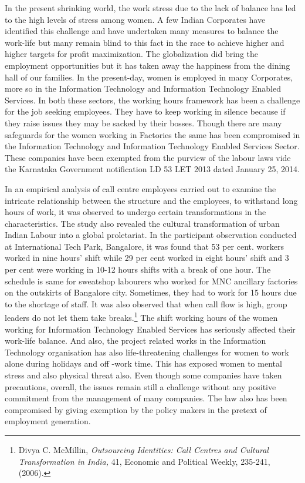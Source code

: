\begin{multicols}{2}

\noi
In the present shrinking world, the work stress due to the lack of balance has led to the high
levels of stress among women. A few Indian Corporates have identified this challenge and
have undertaken many measures to balance the work-life but many remain blind to this fact
in the race to achieve higher and higher targets for profit maximization. The globalization did
bring the employment opportunities but it has taken away the happiness from the dining hall
of our families. In the present-day, women is employed in many Corporates, more so in the
Information Technology and Information Technology Enabled Services. In both these
sectors, the working hours framework has been a challenge for the job seeking employees.
They have to keep working in silence because if they raise issues they may be sacked by their
bosses. Though there are many safeguards for the women working in Factories the same has
been compromised in the Information Technology and Information Technology Enabled
Services Sector. These companies have been exempted from the purview of the labour laws
vide the Karnataka Government notification LD 53 LET 2013 dated January 25, 2014.

\vspace{-.2cm}

\noi
In an empirical analysis of call centre employees carried out to examine the intricate
relationship between the structure and the employees, to withstand long hours of work, it was
observed to undergo certain transformations in the characteristics. The study also revealed the 
cultural transformation of urban Indian Labour into a global proletariat. In the participant
observation conducted at International Tech Park, Bangalore, it was found that 53 per cent.
workers worked in nine hours’ shift while 29 per cent worked in eight hours’ shift and 3 per
cent were working in 10-12 hours shifts with a break of one hour. The schedule is same for
sweatshop labourers who worked for MNC ancillary factories on the outskirts of Bangalore
city. Sometimes, they had to work for 15 hours due to the shortage of staff. It was also
observed that when call flow is high, group leaders do not let them take breaks.\footnote{Divya C. McMillin, \textit{Outsourcing Identities: Call Centres and Cultural Transformation in India,} 41, Economic and Political Weekly, 235-241, (2006).} The shift
working hours of the women working for Information Technology Enabled Services has
seriously affected their work-life balance. And also, the project related works in the
Information Technology organisation has also life-threatening challenges for women to work
alone during holidays and off -work time. This has exposed women to mental stress and also
physical threat also. Even though some companies have taken precautions, overall, the issues
remain still a challenge without any positive commitment from the management of many
companies. The law also has been compromised by giving exemption by the policy makers in
the pretext of employment generation.


\end{multicols}
